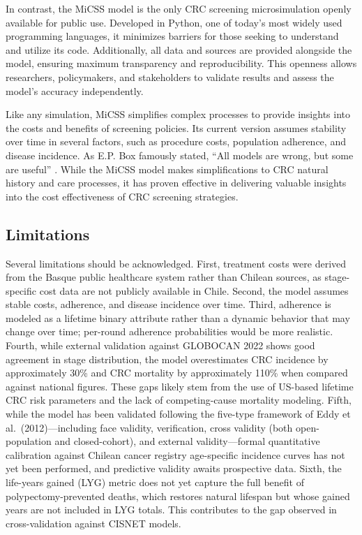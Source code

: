 \documentclass[sn-mathphys-num]{sn-jnl}%
\theoremstyle{thmstyleone}%
\theoremstyle{thmstyletwo}%
\theoremstyle{thmstylethree}%
\begin{document}
In contrast, the MiCSS model is the only CRC screening microsimulation openly available for public use. Developed in Python, one of today’s most widely used programming languages, it minimizes barriers for those seeking to understand and utilize its code. Additionally, all data and sources are provided alongside the model, ensuring maximum transparency and reproducibility. This openness allows researchers, policymakers, and stakeholders to validate results and assess the model's accuracy independently.

Like any simulation, MiCSS simplifies complex processes to provide insights into the costs and benefits of screening policies. Its current version assumes stability over time in several factors, such as procedure costs, population adherence, and disease incidence. As E.P. Box famously stated, ``All models are wrong, but some are useful'' \cite{box_robustness_1979}. While the MiCSS model makes simplifications to CRC natural history and care processes, it has proven effective in delivering valuable insights into the cost effectiveness of CRC screening strategies.

\subsection{Limitations}

Several limitations should be acknowledged. First, treatment costs were derived from the Basque public healthcare system rather than Chilean sources, as stage-specific cost data are not publicly available in Chile. Second, the model assumes stable costs, adherence, and disease incidence over time. Third, adherence is modeled as a lifetime binary attribute rather than a dynamic behavior that may change over time; per-round adherence probabilities would be more realistic. Fourth, while external validation against GLOBOCAN 2022 shows good agreement in stage distribution, the model overestimates CRC incidence by approximately 30\% and CRC mortality by approximately 110\% when compared against national figures. These gaps likely stem from the use of US-based lifetime CRC risk parameters and the lack of competing-cause mortality modeling. Fifth, while the model has been validated following the five-type framework of Eddy et al.\ (2012)---including face validity, verification, cross validity (both open-population and closed-cohort), and external validity---formal quantitative calibration against Chilean cancer registry age-specific incidence curves has not yet been performed, and predictive validity awaits prospective data. Sixth, the life-years gained (LYG) metric does not yet capture the full benefit of polypectomy-prevented deaths, which restores natural lifespan but whose gained years are not included in LYG totals. This contributes to the gap observed in cross-validation against CISNET models.
\end{document}
